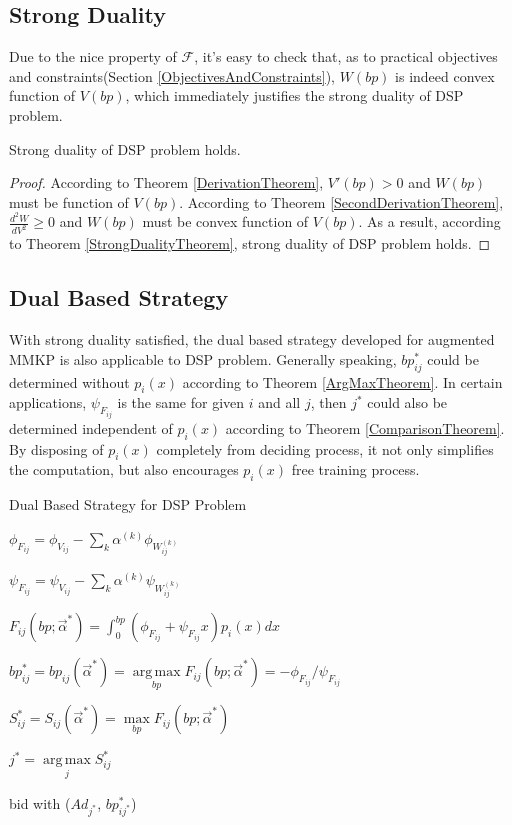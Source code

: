 \documentclass[sigconf]{acmart}
\DeclareMathOperator*{\argmax}{arg\,max}
\newcommand{\sbp}{bp_{ij}}
\newcommand{\sV}{V_{ij}}
\newcommand{\sW}{W_{ij}^{(k)}}
\newcommand{\salpha}{\alpha^{(k)}}
\newcommand{\sF}{F_{ij}}
\newcommand{\sS}{S_{ij}}
\newcommand{\valpha}{\vec{\alpha}}
\newcommand{\pprob}{\phi}
\newcommand{\pcost}{\psi}
\newcommand{\uff}{\mathscr{F}}
\begin{document}
\subsection{Strong Duality}

Due to the nice property of $\uff$, it's easy to check that,
    as to practical objectives and constraints(Section \ref{ObjectivesAndConstraints}),
    $W(bp)$ is indeed convex function of $V(bp)$,
    which immediately justifies the strong duality of DSP problem.

\begin{theorem}
Strong duality of DSP problem holds.
\end{theorem}

\begin{proof}
According to Theorem \ref{DerivationTheorem}, $V'(bp)>0$ and $W(bp)$ must be function of $V(bp)$.
According to Theorem \ref{SecondDerivationTheorem}, $\frac{d^2W}{dV^2}\ge0$ and $W(bp)$ must be convex function of $V(bp)$.
As a result, according to Theorem \ref{StrongDualityTheorem}, strong duality of DSP problem holds.
\end{proof}

\subsection{Dual Based Strategy} \label{DSPDualBasedStrategy}

With strong duality satisfied, the dual based strategy developed for augmented MMKP is also applicable to DSP problem.
Generally speaking, $\sbp^*$ could be determined without $p_i(x)$ according to Theorem \ref{ArgMaxTheorem}.
In certain applications, $\pcost_{\sF}$ is the same for given $i$ and all $j$,
    then $j^*$ could also be determined independent of $p_i(x)$ according to Theorem \ref{ComparisonTheorem}.
By disposing of $p_i(x)$ completely from deciding process, it not only simplifies the computation,
    but also encourages $p_i(x)$ free training process.

\begin{algorithm}
\caption{Dual Based Strategy for DSP Problem}

{
  {
    $\pprob_{\sF} = \pprob_{\sV} - \sum\limits_k \salpha \pprob_{\sW}$

    $\pcost_{\sF} = \pcost_{\sV} - \sum\limits_k \salpha \pcost_{\sW}$

    $\sF(bp; \valpha^*) = \int_0^{bp} (\pprob_{\sF}+\pcost_{\sF}x)p_i(x)dx$

    $\sbp^* = \sbp(\valpha^*) = \argmax\limits_{bp} \sF(bp; \valpha^*) = -\pprob_{\sF} / \pcost_{\sF}$

    $\sS^* = \sS(\valpha^*) = \max\limits_{bp} \sF(bp; \valpha^*)$
  }
  $j^* = \argmax\limits_j \sS^*$
  
   { bid with ($Ad_{j^*}$, $bp_{ij^*}^*$) }
}
\end{algorithm}
\end{document}
